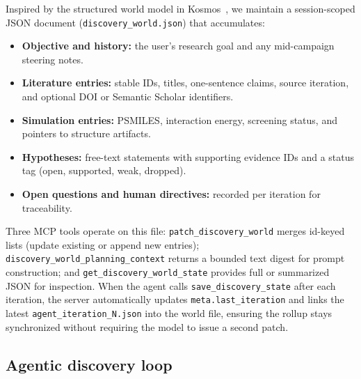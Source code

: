 \documentclass[twocolumn]{fairmeta}
\begin{document}
Inspired by the structured world model in Kosmos~\cite{kosmos2025}, we maintain a session-scoped JSON document (\texttt{discovery\_world.json}) that accumulates:
\begin{itemize}
\item \textbf{Objective and history:} the user's research goal and any mid-campaign steering notes.
\item \textbf{Literature entries:} stable IDs, titles, one-sentence claims, source iteration, and optional DOI or Semantic Scholar identifiers.
\item \textbf{Simulation entries:} PSMILES, interaction energy, screening status, and pointers to structure artifacts.
\item \textbf{Hypotheses:} free-text statements with supporting evidence IDs and a status tag (open, supported, weak, dropped).
\item \textbf{Open questions and human directives:} recorded per iteration for traceability.
\end{itemize}
Three MCP tools operate on this file: \texttt{patch\_discovery\_world} merges id-keyed lists (update existing or append new entries); \texttt{discovery\_world\_planning\_context} returns a bounded text digest for prompt construction; and \texttt{get\_discovery\_world\_state} provides full or summarized JSON for inspection.
When the agent calls \texttt{save\_discovery\_state} after each iteration, the server automatically updates \texttt{meta.last\_iteration} and links the latest \texttt{agent\_iteration\_N.json} into the world file, ensuring the rollup stays synchronized without requiring the model to issue a second patch.

\subsection{Agentic discovery loop}
\end{document}
